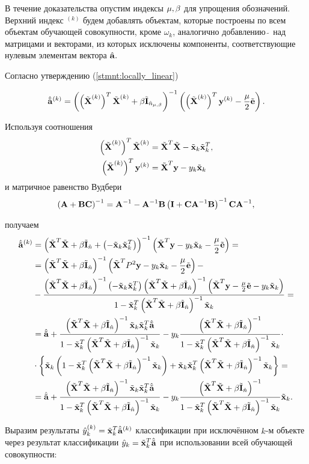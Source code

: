 \begin{Proof}
\def\this{^{(k)}}
В течение доказательства опустим индексы ${\mu,\beta}$ для упрощения обозначений. 
Верхний индекс ${}\this$ будем добавлять объектам, которые построены по всем объектам обучающей совокупности, кроме $\omega_k$, аналогично добавлению $\tilde{\:}$ над матрицами и векторами, из которых исключены компоненты, соответствующие нулевым элементам вектора $\hat{\boldsymbol{\mathbf{a}}}.$

Согласно утверждению (\ref{stmnt:locally_linear})

\begin{equation*}
	\besta^{(k)}
		= \cbr{\cbr{\tilde{\mb X}\this}^T \tilde{\mb X}\this + \beta \tilde{\mb I}_{\hat n_\lams}}^{-1}\cbr{\cbr{\tilde{\mb X}\this}^T \mb y^{(k)} -\frac\mu2\tilde{\mb e}}.
\end{equation*}

Используя соотношения
\begin{align*}
	\cbr{\tilde {\mb X}\this}^T \tilde{\mb X}\this
		&= \tilde{\mb X}^T \tilde{\mb X} - \tilde{\mb x}_k \tilde{\mb x}_k^T, \\
	\cbr{\tilde {\mb X}\this}^T \mb y^{(k)}
		&= \tilde{\mb X}^T \mb y - y_k \tilde{\mb x}_k
\end{align*}
и матричное равенство Вудбери
\begin{equation*}
	\left(\boldsymbol{\mathbf{A}}+\boldsymbol{\mathbf{B}} \boldsymbol{\mathbf{C}}\right)^{-1} = \boldsymbol{\mathbf{A}}^{-1} - \boldsymbol{\mathbf{A}}^{-1} \boldsymbol{\mathbf{B}}\left(\boldsymbol{\mathbf{I}} + \boldsymbol{\mathbf{C}} \boldsymbol{\mathbf{A}}^{-1} \boldsymbol{\mathbf{B}}\right)^{-1} \boldsymbol{\mathbf{C}} \boldsymbol{\mathbf{A}}^{-1},
\end{equation*}

получаем
\begin{align*}
	\besta\this
		&= \inv{\A + \cbr{- \xxt}}
		\cbr{\tilde{\mb X}^T \mb y - y_k\tilde{\mb x}_k -\frac\mu2\tilde{\mb e}} = \\
		&= \inv{\A} \cbr{\tilde{\mb X}^T P^2\mb y - y_k\tilde{\mb x}_k -\frac\mu2\tilde{\mb e}} - \\
		&- \frac{\inv{\A}\cbr{-\xxt}\inv{\A}\cbr{\tilde{\mb X}^T \mb y  -\frac\mu2\tilde{\mb e} - y_k\tilde{\mb x}_k}}{\denominator} = \\
		&= \besta + \frac{\inv{\A}\xxt\besta}{\denominator}
		- y_k\frac{\inv{\A}}{\denominator} \cdot \\
		&\cdot \fbr{\tilde{\mb x}_k\cbr{\denominator} + \xxt\inv{\A}\tilde{\mb x}_k} = \\
		&= \besta + \frac{\inv{\A}\xxt\besta}{\denominator} - y_k\frac{\inv{\A}}{\denominator}\tilde{\mb x}_k.
\end{align*}

Выразим результаты $\hat y\this_k = \tilde{\mb x}^T_k\besta\this$ классификации при исключённом $k$-м объекте через результат классификации $\hat y_k = \tilde{\boldsymbol{\mathbf{x}}}^T_k\hat{\tilde{\mathbf a}}$ при использовании всей обучающей совокупности:


\end{Proof}
